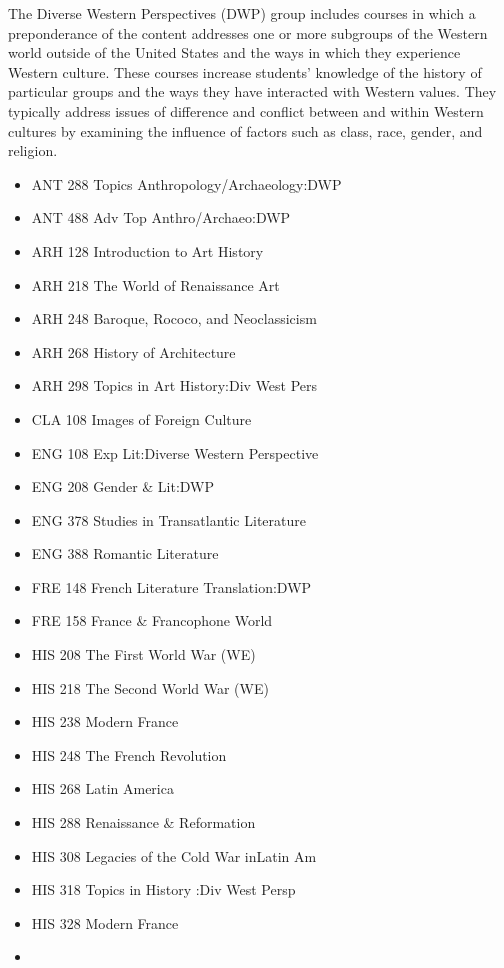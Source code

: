 \documentclass[
  letterpaper,
]{scrbook}
\providecommand{\tightlist}{%
  \setlength{\itemsep}{0pt}\setlength{\parskip}{0pt}}
\begin{document}
The Diverse Western Perspectives (DWP) group includes courses in which a
preponderance of the content addresses one or more subgroups of the
Western world outside of the United States and the ways in which they
experience Western culture. These courses increase students' knowledge
of the history of particular groups and the ways they have interacted
with Western values. They typically address issues of difference and
conflict between and within Western cultures by examining the influence
of factors such as class, race, gender, and religion.

\begin{itemize}
\tightlist
\item
  ANT 288 Topics Anthropology/Archaeology:DWP
\item
  ANT 488 Adv Top Anthro/Archaeo:DWP
\item
  ARH 128 Introduction to Art History
\item
  ARH 218 The World of Renaissance Art
\item
  ARH 248 Baroque, Rococo, and Neoclassicism
\item
  ARH 268 History of Architecture
\item
  ARH 298 Topics in Art History:Div West Pers
\item
  CLA 108 Images of Foreign Culture
\item
  ENG 108 Exp Lit:Diverse Western Perspective
\item
  ENG 208 Gender \& Lit:DWP
\item
  ENG 378 Studies in Transatlantic Literature
\item
  ENG 388 Romantic Literature
\item
  FRE 148 French Literature Translation:DWP
\item
  FRE 158 France \& Francophone World
\item
  HIS 208 The First World War (WE)
\item
  HIS 218 The Second World War (WE)
\item
  HIS 238 Modern France
\item
  HIS 248 The French Revolution
\item
  HIS 268 Latin America
\item
  HIS 288 Renaissance \& Reformation
\item
  HIS 308 Legacies of the Cold War inLatin Am
\item
  HIS 318 Topics in History :Div West Persp
\item
  HIS 328 Modern France
\item

\end{itemize}
\end{document}
